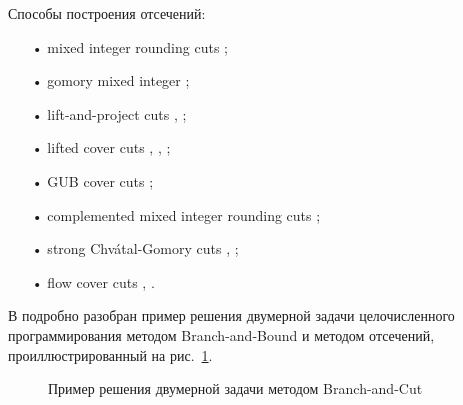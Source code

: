 \documentclass[a4paper,14pt,russian]{extreport}
\begin{document}
\par Способы построения отсечений:
  \begin{itemize}
  \item[•] mixed integer rounding cuts \cite{nemhauser_wolsey};
  \item[•] gomory mixed integer \cite{gomory};
  \item[•] lift-and-project cuts \cite{balas_ceria_corn}, \cite{balas_ceria_corn_1};
  \item[•] lifted cover cuts \cite{balas}, \cite{balas_zemel}, \cite{martin_weismantel};
  \item[•] GUB cover cuts \cite{wolsey};
  \item[•] complemented mixed integer rounding cuts \cite{marchand_wolsey};
  \item[•] strong Chvátal-Gomory cuts \cite{chvatal}, \cite{letchford_lodi};
  \item[•] flow cover cuts \cite{padberg}, \cite{van_roy}.
  \end{itemize}
\par В \cite{mitchell} подробно разобран пример решения двумерной задачи целочисленного программирования методом Branch-and-Bound и методом отсечений, проиллюстрированный на рис.~\ref{ris:example}.
\par
  \begin{figure}[h]
  \caption{Пример решения двумерной задачи методом Branch-and-Cut}
  \label{ris:example}
  \end{figure}
\end{document}
